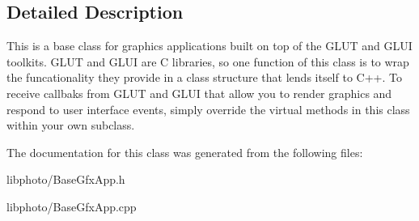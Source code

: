 \subsection{Detailed Description}
This is a base class for graphics applications built on top of the G\-L\-U\-T and G\-L\-U\-I toolkits. G\-L\-U\-T and G\-L\-U\-I are C libraries, so one function of this class is to wrap the funcationality they provide in a class structure that lends itself to C++. To receive callbaks from G\-L\-U\-T and G\-L\-U\-I that allow you to render graphics and respond to user interface events, simply override the virtual methods in this class within your own subclass. 

The documentation for this class was generated from the following files\-:\begin{DoxyCompactItemize}
\item 
libphoto/Base\-Gfx\-App.\-h\item 
libphoto/Base\-Gfx\-App.\-cpp\end{DoxyCompactItemize}
